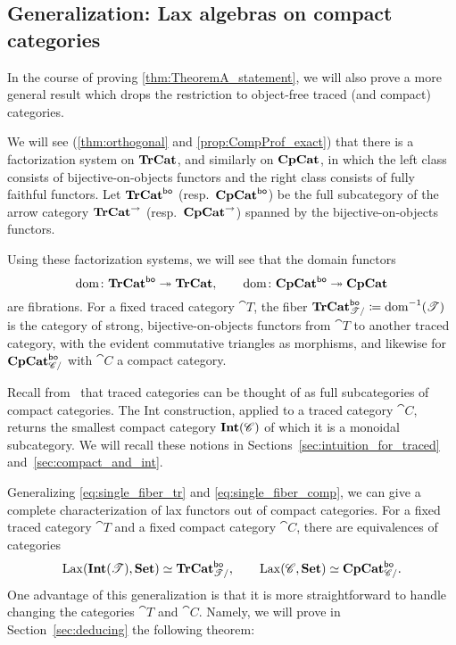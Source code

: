 \documentclass[11pt,oneside,article]{memoir}
\begin{document}
\subsection{Generalization: Lax algebras on compact categories}

In the course of proving \ref{thm:TheoremA_statement}, we will also prove a more general result which drops
the restriction to object-free traced (and compact) categories.

We will see (\ref{thm:orthogonal} and \ref{prop:CompProf_exact}) that there is a factorization
system on $\mathbf{TrCat}$, and similarly on $\mathbf{CpCat}$, in which the left class consists of bijective-on-objects
functors and the right class consists of fully faithful functors. Let $\mathbf{TrCat}^{\mathsf{bo}}$
(resp.~$\mathbf{CpCat}^{\mathsf{bo}}$) be the full subcategory of the arrow category $\mathbf{TrCat}^{\to}$
(resp.~$\mathbf{CpCat}^{\to}$) spanned by the bijective-on-objects functors.

Using these factorization systems, we will see that the domain functors
$$\operatorname{dom}\colon\mathbf{TrCat}^{\mathsf{bo}}\twoheadrightarrow\mathbf{TrCat},\qquad\operatorname{dom}\colon\mathbf{CpCat}^{\mathsf{bo}}\twoheadrightarrow\mathbf{CpCat}$$
are fibrations. For a fixed traced category
$\cat{T}$, the fiber $\mathbf{TrCat}^{\mathsf{bo}}_{\mathscr{T}/}\coloneqq\operatorname{dom}^{-1}(\mathscr{T})$ is the category of strong,
bijective-on-objects functors from $\cat{T}$ to another traced category, with the evident
commutative triangles as morphisms, and likewise for $\mathbf{CpCat}^{\mathsf{bo}}_{\mathscr{C}/}$ with $\cat{C}$ a compact category.

Recall from~\cite{JoyalStreetVerity} that traced categories can be thought of as full subcategories
of compact categories.  The Int construction, applied to a traced category $\cat{C}$, returns the
smallest compact category $\mathbf{Int}(\mathscr{C})$ of which it is a monoidal subcategory. We will recall these
notions in Sections~\ref{sec:intuition_for_traced} and~\ref{sec:compact_and_int}.

Generalizing \eqref{eq:single_fiber_tr} and \eqref{eq:single_fiber_comp}, we can give a complete characterization of lax functors out of compact categories. For a fixed traced
category $\cat{T}$ and a fixed compact category $\cat{C}$, there are equivalences of categories
\begin{equation}\label{eqn:lax_compcat_bo}
   \operatorname{Lax}(\mathbf{Int}(\mathscr{T}),\mathbf{Set})\simeq\mathbf{TrCat}^{\mathsf{bo}}_{\mathscr{T}/},
   \qquad
   \operatorname{Lax}(\mathscr{C},\mathbf{Set})\simeq\mathbf{CpCat}^{\mathsf{bo}}_{\mathscr{C}/}.
\end{equation}
One advantage of this generalization is that it is more straightforward to handle changing the
categories $\cat{T}$ and $\cat{C}$. Namely, we will prove in Section~\ref{sec:deducing} the
following theorem:
\end{document}
